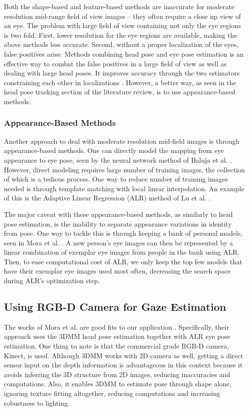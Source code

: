 Both the shape-based and feature-based methods are inaccurate for moderate resolution mid-range field of view images -- they often require a close up view of an eye.  The problem with large field of view containing not only the eye regions is two fold.  First, lower resolution for the eye regions are available, making the above methods less accurate.  Second, without a proper localization of the eyes, false positives arise.  Methods combining head pose and eye pose estimation is an effective way to combat the false positives in a large field of view as well as dealing with large head poses.  It improves accuracy through the two estimators constraining each other in localizations \cite{valenti2012combining}.  However, a better way, as seen in the head pose tracking section of the literature review, is to use appearance-based methods.


\subsubsection{Appearance-Based Methods}
Another approach to deal with moderate resolution mid-field images is through appearance-based methods.  One can directly model the mapping from eye appearance to eye pose, seen by the neural network method of Baluja et al. \cite{baluja1994non}.  However, direct modeling requires large number of training images, the collection of which is a tedious process.  One way to reduce number of training images needed is through template matching with local linear interpolation.  An example of this is the Adaptive Linear Regression (ALR) method of Lu et al. \cite{lu2011inferring}.


The major caveat with these appearance-based methods, as similarly to head pose estimation, is the inability to separate appearance variations in identity from pose.  One way to tackle this is through keeping a bank of personal models, seen in Mora et al. \cite{funes2013person}.  A new person's eye images can then be represented by a linear combination of exemplar eye images from people in the bank using ALR.  Then, to ease computational cost of ALR, we only keep the top few models that have their exemplar eye images used most often, decreasing the search space during ALR's optimization step.


\subsection{Using RGB-D Camera for Gaze Estimation}
The works of Mora et al. are good fits to our application \cite{funes2012gaze, funes2013person}.  Specifically, their approach uses the 3DMM head pose estimation together with ALR eye pose estimation.  One thing to note is that the commercial grade RGB-D camera, Kinect, is used.  Although 3DMM works with 2D camera as well, getting a direct sensor input on the depth information is advantageous in this context because it avoids inferring the 3D structure from 2D images, reducing inaccuracies and computations. Also, it enables 3DMM to estimate pose through shape alone, ignoring texture fitting altogether, reducing computations and increasing robustness to lighting.


